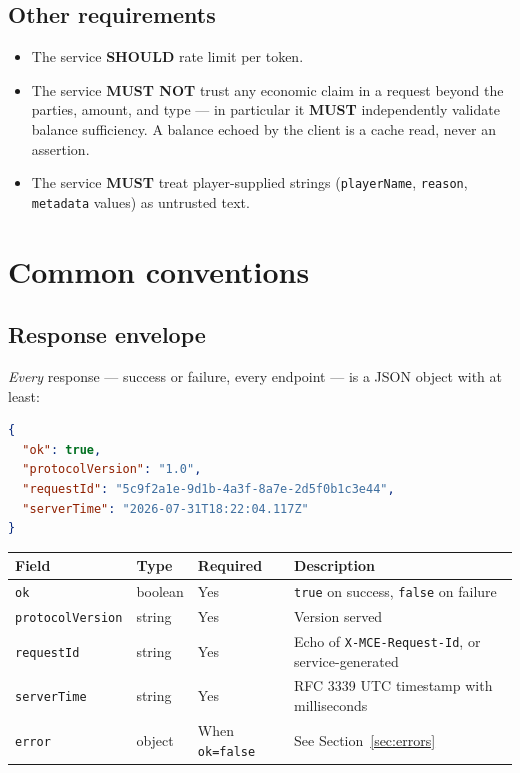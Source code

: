 \documentclass[11pt,a4paper]{article}
\newcommand{\code}[1]{\texttt{\small #1}}
\newcommand{\req}{\textbf{MUST}}
\newcommand{\rec}{\textbf{SHOULD}}
\begin{document}
\subsection{Other requirements}
\begin{itemize}
\item The service \rec{} rate limit per token.
\item The service \textbf{MUST NOT} trust any economic claim in a request beyond the parties,
      amount, and type --- in particular it \req{} independently validate balance sufficiency. A
      balance echoed by the client is a cache read, never an assertion.
\item The service \req{} treat player-supplied strings (\code{playerName}, \code{reason},
      \code{metadata} values) as untrusted text.
\end{itemize}

\section{Common conventions}

\subsection{Response envelope}

\emph{Every} response --- success or failure, every endpoint --- is a JSON object with at least:

\begin{lstlisting}[language=json]
{
  "ok": true,
  "protocolVersion": "1.0",
  "requestId": "5c9f2a1e-9d1b-4a3f-8a7e-2d5f0b1c3e44",
  "serverTime": "2026-07-31T18:22:04.117Z"
}
\end{lstlisting}

\begin{tabularx}{\linewidth}{L{3.2cm} L{1.9cm} L{1.9cm} X}
\toprule
\textbf{Field} & \textbf{Type} & \textbf{Required} & \textbf{Description}\\
\midrule
\code{ok}              & boolean & Yes & \code{true} on success, \code{false} on failure\\
\code{protocolVersion} & string  & Yes & Version served\\
\code{requestId}       & string  & Yes & Echo of \code{X-MCE-Request-Id}, or service-generated\\
\code{serverTime}      & string  & Yes & RFC 3339 UTC timestamp with milliseconds\\
\code{error}           & object  & When \code{ok=false} & See Section~\ref{sec:errors}\\
\bottomrule
\end{tabularx}
\end{document}

